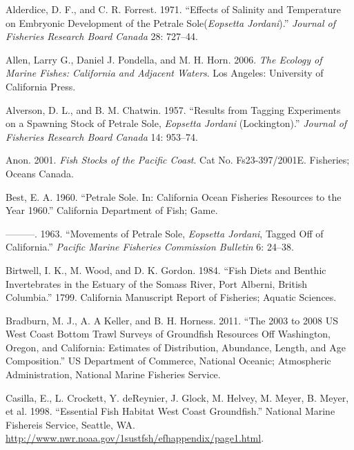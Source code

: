 \documentclass[11pt,
  english,
  letterpaper,
]{article}
\newlength{\cslhangindent}
\newenvironment{CSLReferences}[2] %
 {%
  \setlength{\parindent}{0pt}
  \ifodd #1 \everypar{\setlength{\hangindent}{\cslhangindent}}\ignorespaces\fi
  \ifnum #2 > 0
  \setlength{\parskip}{#2\baselineskip}
  \fi
 }%
 {}
\begin{document}
\hypertarget{refs}{}
\begin{CSLReferences}{1}{0}
\leavevmode{}%
Alderdice, D. F., and C. R. Forrest. 1971. {``Effects of Salinity and Temperature on Embryonic Development of the Petrale Sole(\emph{{Eopsetta} Jordani}).''} \emph{Journal of Fisheries Research Board Canada} 28: 727--44.

\leavevmode{}%
Allen, Larry G., Daniel J. Pondella, and M. H. Horn. 2006. \emph{The Ecology of Marine Fishes: {California} and Adjacent Waters}. Los Angeles: University of California Press.

\leavevmode{}%
Alverson, D. L., and B. M. Chatwin. 1957. {``Results from Tagging Experiments on a Spawning Stock of Petrale Sole, \emph{{Eopsetta} Jordani} ({Lockington}).''} \emph{Journal of Fisheries Research Board Canada} 14: 953--74.

\leavevmode{}%
Anon. 2001. \emph{Fish Stocks of the {Pacific} Coast}. Cat No. Fs23-397/2001E. Fisheries; Oceans Canada.

\leavevmode{}%
Best, E. A. 1960. {``Petrale {Sole}. {In}: {California} Ocean Fisheries Resources to the Year 1960.''} California Department of Fish; Game.

\leavevmode{}%
---------. 1963. {``Movements of Petrale Sole, \emph{{Eopsetta} Jordani}, Tagged Off of {California}.''} \emph{Pacific Marine Fisheries Commission Bulletin} 6: 24--38.

\leavevmode{}%
Birtwell, I. K., M. Wood, and D. K. Gordon. 1984. {``Fish Diets and Benthic Invertebrates in the Estuary of the {Somass} {River}, {Port} {Alberni}, {British} {Columbia}.''} 1799. California Manuscript Report of Fisheries; Aquatic Sciences.

\leavevmode{}%
Bradburn, M. J., A. A Keller, and B. H. Horness. 2011. {``The 2003 to 2008 {US} {West} {Coast} Bottom Trawl Surveys of Groundfish Resources Off {Washington}, {Oregon}, and {California}: Estimates of Distribution, Abundance, Length, and Age Composition.''} US Department of Commerce, National Oceanic; Atmospheric Administration, National Marine Fisheries Service.

\leavevmode{}%
Casilla, E., L. Crockett, Y. deReynier, J. Glock, M. Helvey, M. Meyer, B. Meyer, et al. 1998. {``Essential Fish Habitat {West} {Coast} Groundfish.''} National Marine Fishereis Service, Seattle, WA. \url{http://www.nwr.noaa.gov/1sustfsh/efhappendix/page1.html}.


\end{CSLReferences}
\end{document}
